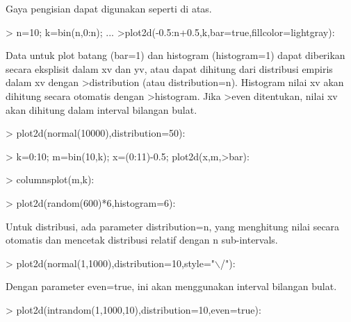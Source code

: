 \documentclass[a4paper,10pt]{article}
\begin{document}
\begin{eulernotebook}
\begin{eulercomment}
\begin{eulercomment}
\begin{eulercomment}
\begin{eulercomment}
\begin{eulercomment}
\begin{eulercomment}
\begin{eulercomment}
Gaya pengisian dapat digunakan seperti di atas.
\end{eulercomment}
\begin{eulerprompt}
> n=10; k=bin(n,0:n); ...
>plot2d(-0.5:n+0.5,k,bar=true,fillcolor=lightgray):
\end{eulerprompt}
\begin{eulercomment}
Data untuk plot batang (bar=1) dan histogram (histogram=1) dapat
diberikan secara eksplisit dalam xv dan yv, atau dapat dihitung dari
distribusi empiris dalam xv dengan \textgreater{}distribution (atau
distribution=n). Histogram nilai xv akan dihitung secara otomatis
dengan \textgreater{}histogram. Jika \textgreater{}even ditentukan, nilai xv akan dihitung dalam
interval bilangan bulat.
\end{eulercomment}
\begin{eulerprompt}
> plot2d(normal(10000),distribution=50):
\end{eulerprompt}
\begin{eulerprompt}
> k=0:10; m=bin(10,k); x=(0:11)-0.5; plot2d(x,m,>bar):
\end{eulerprompt}
\begin{eulerprompt}
> columnsplot(m,k):
\end{eulerprompt}
\begin{eulerprompt}
> plot2d(random(600)*6,histogram=6):
\end{eulerprompt}
\begin{eulercomment}
Untuk distribusi, ada parameter distribution=n, yang menghitung nilai
secara otomatis dan mencetak distribusi relatif dengan n
sub-intervals.
\end{eulercomment}
\begin{eulerprompt}
> plot2d(normal(1,1000),distribution=10,style="\(\backslash\)/"):
\end{eulerprompt}
\begin{eulercomment}
Dengan parameter even=true, ini akan menggunakan interval bilangan
bulat.
\end{eulercomment}
\begin{eulerprompt}
> plot2d(intrandom(1,1000,10),distribution=10,even=true):

\end{eulerprompt}
\end{eulercomment}
\end{eulercomment}
\end{eulercomment}
\end{eulercomment}
\end{eulercomment}
\end{eulercomment}
\end{eulernotebook}
\end{document}
